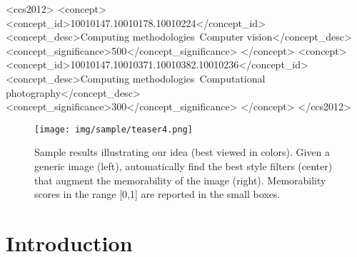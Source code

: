 \documentclass{sig-alternate-05-2015}
\begin{document}
%
%
 \begin{CCSXML}
<ccs2012>
<concept>
<concept_id>10010147.10010178.10010224</concept_id>
<concept_desc>Computing methodologies~Computer vision</concept_desc>
<concept_significance>500</concept_significance>
</concept>
<concept>
<concept_id>10010147.10010371.10010382.10010236</concept_id>
<concept_desc>Computing methodologies~Computational photography</concept_desc>
<concept_significance>300</concept_significance>
</concept>
</ccs2012>
\end{CCSXML}




%
%

%
%
\printccsdesc




\begin{figure}[t]
\texttt{[image: img/sample/teaser4.png]}
\vspace{-0.7cm}
\caption{Sample results illustrating our idea (best viewed in colors). Given a generic image (left), automatically find the best style filters (center) that augment the memorability of the image (right). Memorability scores in the range [0,1] are reported in the small boxes.}
\label{fig:teaser}
\vspace{-0.3cm}
\end{figure}

\vspace{1.0cm}
\section{Introduction}
\end{document}
